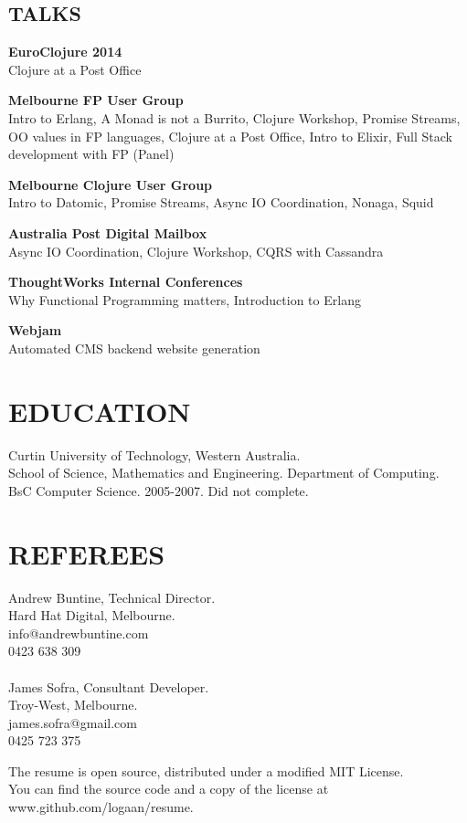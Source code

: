 \documentclass[margin]{res}
\begin{document}
\begin{resume}

  \begin{multicols}{2}
    \section{TALKS}
    \textbf{EuroClojure 2014} \\
    Clojure at a Post Office

    \textbf{Melbourne FP User Group} \\
    Intro to Erlang, A Monad is not a Burrito, Clojure Workshop, Promise
    Streams, OO values in FP languages, Clojure at a Post Office, Intro to
    Elixir, Full Stack development with FP (Panel)

    \textbf{Melbourne Clojure User Group} \\
    Intro to Datomic, Promise Streams, Async IO Coordination, Nonaga, Squid

    \columnbreak

    \textbf{Australia Post Digital Mailbox} \\
    Async IO Coordination, Clojure Workshop, CQRS with Cassandra

    \textbf{ThoughtWorks Internal Conferences} \\
    Why Functional Programming matters, Introduction to Erlang

    \textbf{Webjam} \\
    Automated CMS backend website generation
  \end{multicols}

  \section{EDUCATION}
  Curtin University of Technology, Western Australia. \\
  School of Science, Mathematics and
  Engineering. Department of Computing. \\
  BsC Computer Science. 2005-2007. Did not complete.

  \section{REFEREES}
  Andrew Buntine, Technical Director. \\
  Hard Hat Digital, Melbourne. \\
  info@andrewbuntine.com \\
  0423 638 309 \\
  \\
  James Sofra, Consultant Developer. \\
  Troy-West, Melbourne. \\
  james.sofra@gmail.com \\
  0425 723 375

\end{resume} 

\centering
\hspace{-1.75in}  The resume is open source, distributed under a modified MIT License. \\
\hspace{-1.75in}  You can find the source code and a copy of the license at www.github.com/logaan/resume.
\end{document}
